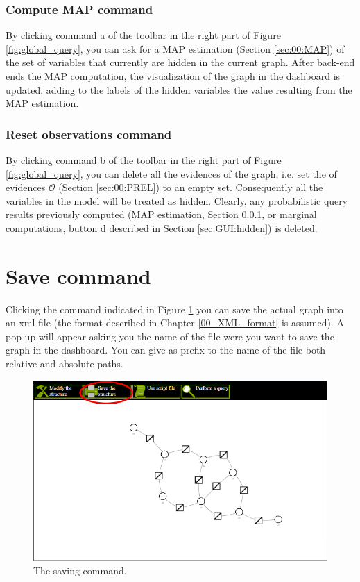 \subsubsection{Compute MAP command}
\label{sec:GUI:MAP_com}

By clicking command a of the toolbar in the right part of Figure \ref{fig:global_query}, you can ask for a MAP estimation (Section \ref{sec:00:MAP}) of the set of variables that currently are hidden in the current graph. After back-end ends the MAP computation, the visualization of the graph in the dashboard is updated, adding to the labels of the hidden variables the value resulting from the MAP estimation.

\subsubsection{Reset observations command}

By clicking command b of the toolbar in the right part of Figure \ref{fig:global_query}, you can delete all the evidences of the graph, i.e. set the of evidences $\mathcal{O}$ (Section \ref{sec:00:PREL}) to an empty set. Consequently all the variables in the model will be treated as hidden. Clearly, any probabilistic query results previously computed (MAP estimation, Section \ref{sec:GUI:MAP_com}, or marginal computations, button d described in Section \ref{sec:GUI:hidden}) is deleted.

\section{Save command}

Clicking the command indicated in Figure \ref{fig:save} you can save the actual graph into an xml file (the format described in Chapter \ref{00_XML_format} is assumed). A pop-up will appear asking you the name of the file were you want to save the graph in the dashboard. You can give as prefix to the name of the file both relative and absolute paths.

\begin{figure}
	\centering
	\includegraphics[width= 0.49 \columnwidth]{../src/Chapter_additional/04_EFG_GUI/image/img_05.png}
	\caption{The saving command.}
	\label{fig:save}
\end{figure} 

